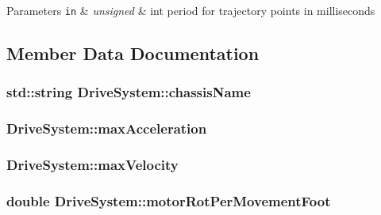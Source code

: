 \begin{DoxyParams}[1]{Parameters}
\mbox{\tt in}  & {\em unsigned} & int period for trajectory points in milliseconds \\
\hline
\end{DoxyParams}


\subsection{Member Data Documentation}
\hypertarget{classDriveSystem_a9751d2041e38600dafc1d4575f0b7c2a}{
\subsubsection[{chassis\-Name}]{\setlength{\rightskip}{0pt plus 5cm}std\-::string Drive\-System\-::chassis\-Name\hspace{0.3cm}{\ttfamily [protected]}}}\label{classDriveSystem_a9751d2041e38600dafc1d4575f0b7c2a}
\hypertarget{classDriveSystem_a3f36b9c2b93fb6ed87cdb698a812087e}{
\subsubsection[{max\-Acceleration}]{ Drive\-System\-::max\-Acceleration\hspace{0.3cm}{\ttfamily [protected]}}}\label{classDriveSystem_a3f36b9c2b93fb6ed87cdb698a812087e}
\hypertarget{classDriveSystem_a3a9b75c1ae1147548d155a64432cedc4}{
\subsubsection[{max\-Velocity}]{ Drive\-System\-::max\-Velocity\hspace{0.3cm}{\ttfamily [protected]}}}\label{classDriveSystem_a3a9b75c1ae1147548d155a64432cedc4}
\hypertarget{classDriveSystem_acb0ea84b9cff42cd2b3619da7547ec06}{
\subsubsection[{motor\-Rot\-Per\-Movement\-Foot}]{\setlength{\rightskip}{0pt plus 5cm}double Drive\-System\-::motor\-Rot\-Per\-Movement\-Foot\hspace{0.3cm}{\ttfamily [protected]}}}\label{classDriveSystem_acb0ea84b9cff42cd2b3619da7547ec06}
